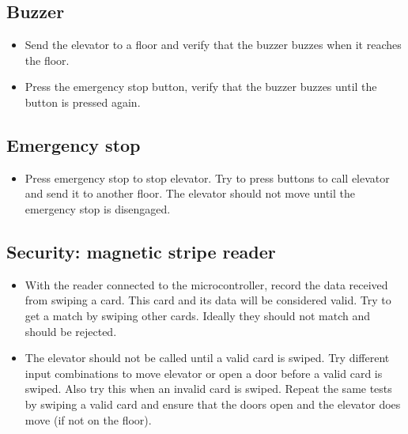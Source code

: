 \documentclass{article}
\begin{document}
	    \subsection{Buzzer}
	    \begin{itemize}
	        \item Send the elevator to a floor and verify that the buzzer buzzes when it reaches the floor.
	        \item Press the emergency stop button, verify that the buzzer buzzes until the button is pressed again.
	    \end{itemize}
	    
	    \subsection{Emergency stop}
	    \begin{itemize}
	        \item Press emergency stop to stop elevator. Try to press buttons to call elevator and send it to another floor. The elevator should not move until the emergency stop is disengaged.
	    \end{itemize}
	    
	    \subsection{Security: magnetic stripe reader}
	    \begin{itemize}
	        \item With the reader connected to the microcontroller, record the data received from swiping a card. This card and its data will be considered valid. Try to get a match by swiping other cards. Ideally they should not match and should be rejected.
	        \item The elevator should not be called until a valid card is swiped. Try different input combinations to move elevator or open a door before a valid card is swiped. Also try this when an invalid card is swiped. Repeat the same tests by swiping a valid card and ensure that the doors open and the elevator does move (if not on the floor).
	    \end{itemize}
	    
\end{document}
